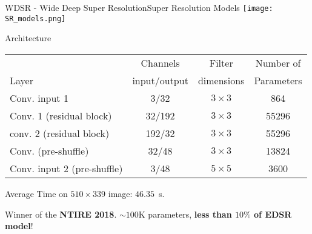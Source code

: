 \documentclass{standalone}
\begin{document}
\begin{frame}{WDSR - Wide Deep Super Resolution}{Super Resolution Models}
  \centering
  \texttt{[image: SR\_models.png]}


  \begin{block}{Architecture}
    \scriptsize{
    \begin{tabular}{lccc}
      \hline \rowcolor{NormalBlue}
                                  &  Channels     & Filter     & Number of    \\
      \rowcolor{NormalBlue}
      Layer                       & input/output  & dimensions & Parameters   \\
      \hline
      Conv. input 1               & 3/32       & $3\times3$   & 864     \\
      Conv. 1 (residual block)    & 32/192     & $3\times3$   & 55296   \\
      conv. 2 (residual block)    & 192/32     & $3\times3$   & 55296   \\
      Conv. (pre-shuffle)         & 32/48      & $3\times3$   & 13824   \\
      Conv. input 2 (pre-shuffle) & 3/48       & $5\times5$   & 3600    \\
      \hline
    \end{tabular}
    }

    \vspace{0.5cm}
    \scriptsize{Average Time on $510\times339$ image: $46.35$~s.}

    \scriptsize{Winner of the \textbf{NTIRE 2018}. $\sim100$K parameters, \textbf{less than $10\%$ of EDSR model}!}
  \end{block}

\end{frame}
\end{document}
